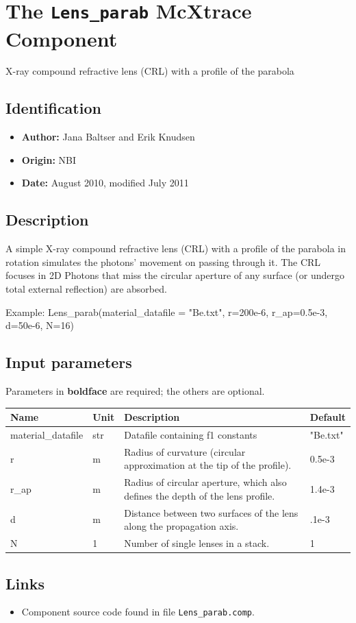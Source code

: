 \section{The \texttt{Lens\_parab} McXtrace Component}
X-ray compound refractive lens (CRL) with a profile of the parabola

\subsection*{Identification}
\begin{itemize}
  \item \textbf{Author:} Jana Baltser and Erik Knudsen
  \item \textbf{Origin:} NBI
  \item \textbf{Date:} August 2010, modified July 2011
\end{itemize}

\subsection*{Description}
A simple X-ray compound refractive lens (CRL) with a profile of the parabola in rotation simulates the photons' movement on passing through it. The CRL focuses in 2D Photons that miss the circular aperture of any surface (or undergo total external reflection) are absorbed.

Example: Lens\_parab(material\_datafile = "Be.txt", r=200e-6, r\_ap=0.5e-3, d=50e-6, N=16)

\subsection*{Input parameters}
Parameters in \textbf{boldface} are required; the others are optional.

\begin{longtable}{p{}p{}p{}p{}}
\toprule
\textbf{Name} & \textbf{Unit} & \textbf{Description} & \textbf{Default} \\
\midrule
\endhead
material\_datafile & str & Datafile containing f1 constants & "Be.txt" \\
r & m & Radius of curvature (circular approximation at the tip of the profile). & 0.5e-3 \\
r\_ap & m & Radius of circular aperture, which also defines the depth of the lens profile. & 1.4e-3 \\
d & m & Distance between two surfaces of the lens along the propagation axis. & .1e-3 \\
N & 1 & Number of single lenses in a stack. & 1 \\
\bottomrule
\end{longtable}

\subsection*{Links}
\begin{itemize}
  \item Component source code found in file \texttt{Lens\_parab.comp}.
\end{itemize}
